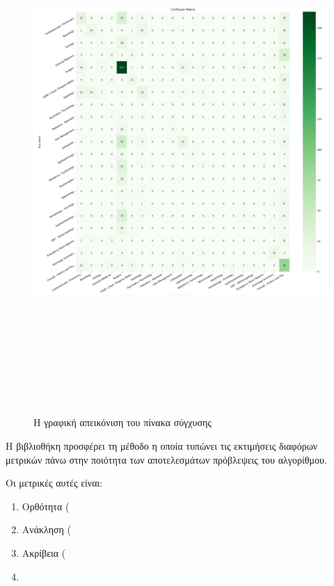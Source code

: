 \begin{figure} [ht!]
\centering
\includegraphics[width=\textwidth,height=20cm,keepaspectratio]{pictures/5.3cMatrix.png} 
\caption{Η γραφική απεικόνιση του πίνακα σύγχυσης}\label{figure5.3}
\end{figure}
\clearpage

H βιβλιοθήκη  προσφέρει τη μέθοδο  η οποία τυπώνει τις εκτιμήσεις διαφόρων μετρικών πάνω στην ποιότητα  των αποτελεσμάτων πρόβλεψεις του αλγορίθμου. 

Οι μετρικές αυτές είναι:
\begin{enumerate}
    \item Ορθότητα (
    \item Ανάκληση ( 
    \item Ακρίβεια ( 
    \item {} 
\end{enumerate}


